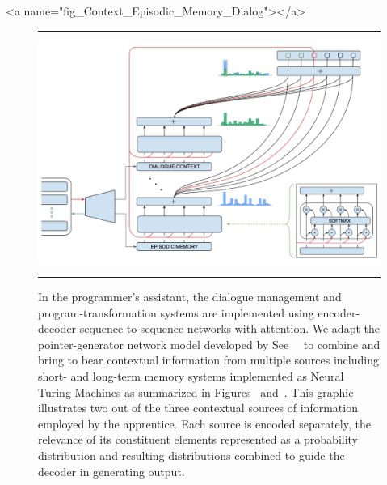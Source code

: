 
\setcounter{figure}{62}

                   
\rawhtml
<a name="fig_Context_Episodic_Memory_Dialog"></a>
\endrawhtml
\begin{figure}
%
  \hrule{}
%
  \begin{center} 
    \includegraphics[width=820pt]{./figures/Context_Episodic_Memory_Dialog.png} %
  \end{center}
%
  \caption{In the programmer's assistant, the dialogue management and program-transformation systems are implemented using encoder-decoder sequence-to-sequence networks with attention. We adapt the pointer-generator network model developed by See~\etal{}~\cite{SeeetalACL-17} to combine and bring to bear contextual information from multiple sources including short- and long-term memory systems implemented as Neural Turing Machines as summarized in Figures~{} and~{}. This graphic illustrates two out of the three contextual sources of information employed by the apprentice. Each source is encoded separately, the relevance of its constituent elements represented as a probability distribution and resulting distributions combined to guide the decoder in generating output.}
%
  \hrule{}
%
\end{figure}


